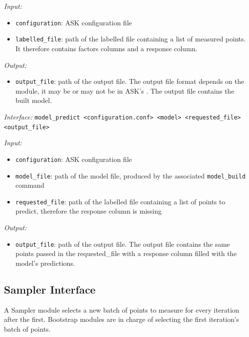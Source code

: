 \emph{Input:}
\begin{itemize}
	\item \texttt{configuration}: ASK configuration file
	\item \texttt{labelled\_file}: path of the labelled file containing a list of measured points. It therefore contains factors columns and a response column.
\end{itemize}

\emph{Output:}
\begin{itemize}
	\item \texttt{output\_file}: path of the output file. The output file format depends on the module, it may be or may not be in ASK's . The output file contains the built model.
\end{itemize}

\emph{Interface:} \texttt{model\_predict \textless{}configuration.conf\textgreater{} \textless{}model\textgreater{} \textless{}requested\_file\textgreater{} \textless{}output\_file\textgreater{}} 

\emph{Input:}
\begin{itemize}
	\item \texttt{configuration}: ASK configuration file
	\item \texttt{model\_file}: path of the model file, produced by the associated \texttt{model\_build} command
	\item \texttt{requested\_file}: path of the labelled file containing a list of points to predict, therefore the response column is missing
\end{itemize}

\emph{Output:}
\begin{itemize}
	\item \texttt{output\_file}: path of the output file. The output file contains the same points passed in the requested\_file with a response column filled with the model's predictions.
\end{itemize}

\subsection{Sampler Interface}

A Sampler module selects a new batch of points to measure for every iteration after the first.
Bootstrap modules are in charge of selecting the first iteration's batch of points.

